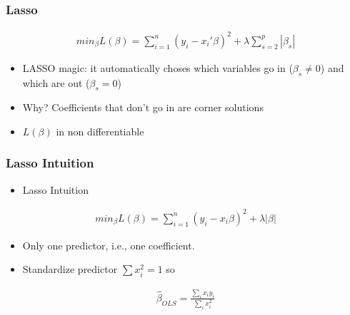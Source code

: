 \documentclass[
  shownotes,
  xcolor={svgnames},
  hyperref={colorlinks,citecolor=DarkBlue,linkcolor=DarkRed,urlcolor=DarkBlue}
  ]{beamer}
\begin{document}
\begin{frame}[fragile]
\frametitle{Lasso}

\begin{align}
min_{\beta} L(\beta) = \sum_{i=1}^n (y_i-x_i'\beta)^2 + \lambda \sum_{s=2}^p |\beta_s| 
\end{align}

\begin{itemize}
\item  LASSO magic: it automatically choses which variables go in ($\beta_s \neq 0$) and which are out  ($\beta_s = 0$)
\item Why? Coefficients that don't go in  are corner solutions 
\item  $L(\beta)$ in non differentiable
\end{itemize}

\end{frame}
\begin{frame}[fragile]
\frametitle{Lasso Intuition}

\begin{itemize}
\item Lasso Intuition
\end{itemize}

\bigskip

\begin{align}
min_{\beta} L(\beta) = \sum_{i=1}^n (y_i-x_i \beta)^2 + \lambda|\beta| 
\end{align}

\begin{itemize}
  \item Only one predictor, i.e., one coefficient.
  \bigskip
  \item Standardize predictor $\sum x_i^2=1$ so
\end{itemize}

\begin{align}
\hat{\beta}_{OLS}= \frac{\sum_i x_i y_i}{\sum_i x_i^2}
\end{align}


\end{frame}
\end{document}
